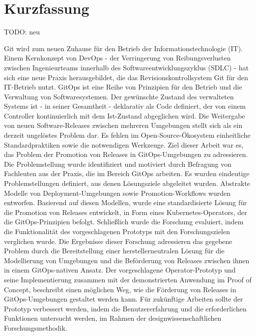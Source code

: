 \chapter{Kurzfassung}

TODO: neu

Git wird zum neuen Zuhause für den Betrieb der Informationstechnologie (IT).
Einem Kernkonzept von DevOps
- der Verringerung von Reibungsverlusten zwischen Ingenieurteams innerhalb des Softwareentwicklungszyklus (SDLC) -
hat sich eine neue Praxis herausgebildet,
die das Revisionskontrollsystem Git für den IT-Betrieb nutzt.
GitOps ist eine Reihe von Prinzipien für den Betrieb und die Verwaltung von Softwaresystemen.
Der gewünschte Zustand des verwalteten Systems ist
- in seiner Gesamtheit -
deklarativ als Code definiert,
der von einem Controller kontinuierlich mit dem Ist-Zustand abgeglichen wird.
Die Weitergabe von neuen Software-Releases zwischen mehreren Umgebungen
stellt sich als ein derzeit ungelöstes Problem dar.
Es fehlen im Open-Source-Ökosystem einheitliche Standardpraktiken sowie die notwendigen Werkzeuge.
Ziel dieser Arbeit war es, das Problem der
Promotion von Releases in GitOps-Umgebungen zu adressieren.
Die Problemstellung wurde identifiziert und motiviert durch
Befragung von Fachleuten aus der Praxis, die im Bereich GitOps arbeiten.
Es wurden eindeutige Problemstellungen definiert, aus denen Lösungsziele abgeleitet wurden.
Abstrakte Modelle von Deployment-Umgebungen sowie Promotion-Workflows
wurden entworfen.
Basierend auf diesen Modellen,
wurde eine standardisierte Lösung für die Promotion von Releases
entwickelt,
in Form eines Kubernetes-Operators,
der die GitOps-Prinzipien befolgt.
Schließlich wurde die Forschung evaluiert, indem
die Funktionalität des vorgeschlagenen Prototyps
mit den Forschungszielen verglichen wurde.
Die Ergebnisse dieser Forschung
adressieren das gegebene Problem
durch die Bereitstellung einer herstellerneutralen Lösung
für die Modellierung von Umgebungen und die Beförderung von Releases zwischen ihnen
in einem GitOps-nativen Ansatz.
Der vorgeschlagene Operator-Prototyp und seine Implementierung zusammen mit
der demonstrierten Anwendung im Proof of Concept,
beschreibt einen möglichen Weg, wie die Förderung von Releases
in GitOps-Umgebungen gestaltet werden kann.
Für zukünftige Arbeiten sollte der Prototyp verbessert werden,
indem die Benutzererfahrung und die erforderlichen Funktionen untersucht werden,
im Rahmen der designwissenschaftlichen Forschungsmethodik.





















